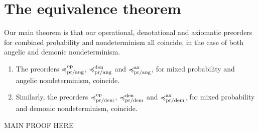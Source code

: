 \section{The equivalence theorem}

Our main theorem is that our operational, denotational and axiomatic preorders for combined probability and nondeterminism all coincide, in the case of both angelic and demonic nondeterminism.
\begin{theorem} \leavevmode
\begin{enumerate} 
\item The preorders $\preccurlyeq^{\text{op}}_{\text{pr/ang}}$, $\preccurlyeq^{\text{den}}_{\text{pr/ang}}$ and $\preccurlyeq^{\text{ax}}_{\text{pr/ang}}$, for mixed probability and angelic nondeterminism, coincide.

\item Similarly, the preorders $\preccurlyeq^{\text{op}}_{\text{pr/dem}}$, $\preccurlyeq^{\text{den}}_{\text{pr/dem}}$ and $\preccurlyeq^{\text{ax}}_{\text{pr/dem}}$,
for mixed probability and demonic nondeterminism, coincide.
\end{enumerate}
\end{theorem}

MAIN PROOF HERE
